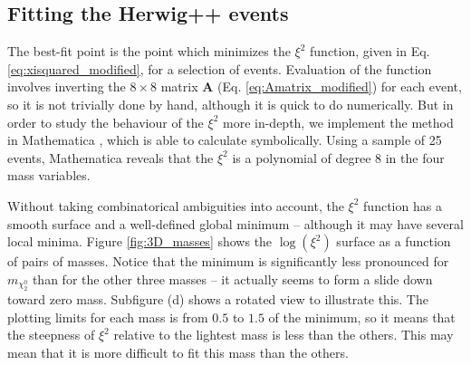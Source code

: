 \documentclass[twoside,english]{uiofysmaster}
\begin{document}


\subsection{Fitting the {\ttfamily Herwig++} events}
The best-fit point is the point which minimizes the $\xi^2$ function, given in Eq. \eqref{eq:xisquared_modified}, for a selection of events. Evaluation of the function involves inverting the $8\times 8$ matrix $\mathbf{A}$ (Eq. \eqref{eq:Amatrix_modified}) for each event, so it is not trivially done by hand, although it is quick to do numerically. But in order to study the behaviour of the $\xi^2$ more in-depth, we implement the method in Mathematica \cite{Mathematica}, which is able to calculate symbolically. Using a sample of 25 events, Mathematica reveals that the $\xi^2$ is a polynomial of degree 8 in the four mass variables. 

Without taking combinatorical ambiguities into account, the $\xi^2$ function has a smooth surface and a well-defined global minimum -- although it may have several local minima. Figure \ref{fig:3D_masses} shows the $\log(\xi^2)$ surface as a function of pairs of masses. Notice that the minimum is significantly less pronounced for $m_{\chi_2^0}$ than for the other three masses -- it actually seems to form a slide down toward zero mass. Subfigure (d) shows a rotated view to illustrate this. The plotting limits for each mass is from $0.5$ to $1.5$ of the minimum, so it means that the steepness of $\xi^2$ relative to the lightest mass is less than the others. This may mean that it is more difficult to fit this mass than the others.
\end{document}
